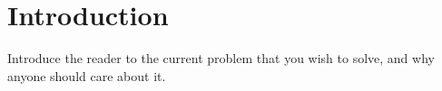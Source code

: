 \chapter{Introduction}
	\label{CH_Intro}

Introduce the reader to the current problem that you wish to solve, and why anyone should care about it.